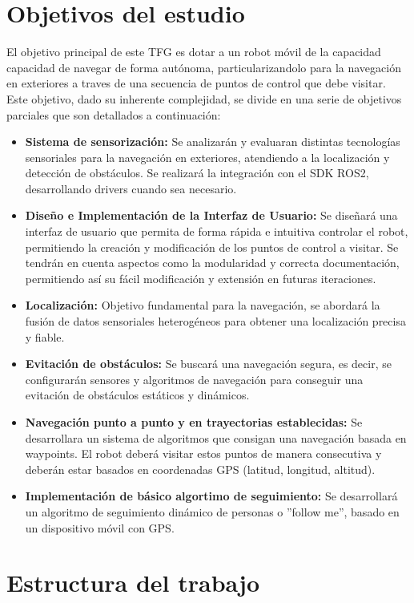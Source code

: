 \section{Objetivos del estudio}
El objetivo principal de este TFG es dotar a un robot móvil de la capacidad capacidad de navegar de forma autónoma, 
particularizandolo para la navegación en exteriores a traves de una secuencia de puntos de control que debe visitar. 
Este objetivo, dado su inherente complejidad, se divide en una serie de objetivos parciales que son detallados a continuación:
\begin{itemize}
  \item \textbf{Sistema de sensorización:} Se analizarán y evaluaran distintas tecnologías sensoriales para la navegación en exteriores, atendiendo a la localización y detección de obstáculos. Se realizará la integración con el SDK ROS2, desarrollando drivers cuando sea necesario.
  \item \textbf{Diseño e Implementación de la Interfaz de Usuario:} Se diseñará una interfaz de usuario que permita de forma rápida e intuitiva controlar el robot, permitiendo la creación y modificación de los puntos de control a visitar. Se tendrán en cuenta aspectos como la modularidad y correcta documentación, permitiendo así su fácil modificación y extensión en futuras iteraciones.
  \item \textbf{Localización:} Objetivo fundamental para la navegación, se abordará la fusión de datos sensoriales heterogéneos para obtener una 
localización precisa y fiable.
  \item \textbf{Evitación de obstáculos:} Se buscará una navegación segura, es decir, se configurarán sensores y algoritmos de navegación para 
conseguir una evitación de obstáculos estáticos y dinámicos.
  \item \textbf{Navegación punto a punto y en trayectorias establecidas:} Se desarrollara un sistema de algoritmos que consigan una navegación 
basada en waypoints. El robot deberá visitar estos puntos de manera consecutiva  y deberán estar basados en coordenadas GPS (latitud, 
longitud, altitud).
\item \textbf{Implementación de básico algortimo de seguimiento:} Se desarrollará un algoritmo de seguimiento dinámico de personas o ''follow me'', basado en un dispositivo móvil con GPS.
\end{itemize}

\section{Estructura del trabajo}

